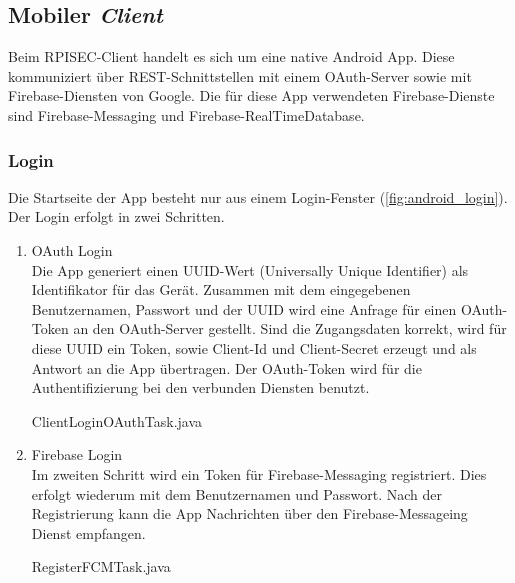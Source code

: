 \subsection{Mobiler \emph{Client}}

Beim RPISEC-Client handelt es sich um eine native Android App. Diese kommuniziert über REST-Schnittstellen mit einem OAuth-Server sowie mit Firebase-Diensten von Google. Die für diese App verwendeten Firebase-Dienste sind Firebase-Messaging und Firebase-RealTimeDatabase.\\

\subsubsection{Login}

Die Startseite der App besteht nur aus einem Login-Fenster (\autoref{fig:android_login}). Der Login erfolgt in zwei Schritten.

\begin{enumerate}
	\item OAuth Login\\
	\newline
	Die App generiert einen UUID-Wert (Universally Unique Identifier) als Identifikator für das Gerät. Zusammen mit dem eingegebenen Benutzernamen, Passwort und der UUID wird eine Anfrage für einen OAuth-Token an den OAuth-Server gestellt. Sind die Zugangsdaten korrekt, wird für diese UUID ein Token, sowie Client-Id und Client-Secret erzeugt und als Antwort an die App übertragen. Der OAuth-Token wird für die Authentifizierung bei den verbunden Diensten benutzt.\\
	
	\begin{code}
		\caption{ClientLoginOAuthTask.java}
		\label{src:ClientLoginOAuthTask}
	\end{code}
	
	\pagebreak
	
	\item  Firebase Login\\
	\newline
	Im zweiten Schritt wird ein Token für Firebase-Messaging registriert. Dies erfolgt wiederum mit dem Benutzernamen und Passwort. Nach der Registrierung kann die App Nachrichten über den Firebase-Messageing Dienst empfangen.\\
	
	\begin{code}
		\caption{RegisterFCMTask.java}
		\yamlFile{\srcDir/RegisterFCMTask.java}
		\label{src:RegisterFCMTask}
	\end{code}
\end{enumerate}

